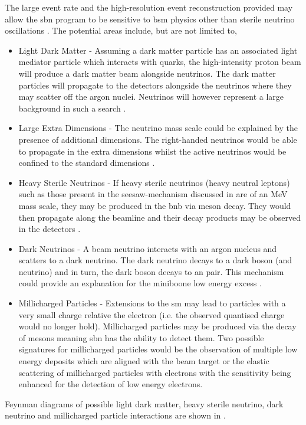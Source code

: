 The large event rate and the high-resolution event reconstruction provided may allow the \gls{sbn} program to be sensitive to \gls{bsm} physics other than sterile neutrino oscillations \cite{SBN_paper}. The potential areas include, but are not limited to,
\begin{itemize}
    \item Light Dark Matter - Assuming a dark matter particle has an associated light mediator particle which interacts with quarks, the high-intensity proton beam will produce a dark matter beam alongside neutrinos. The dark matter particles will propagate to the detectors alongside the neutrinos where they may scatter off the argon nuclei. Neutrinos will however represent a large background in such a search \cite{SBN_paper}. 
    \item Large Extra Dimensions - The neutrino mass scale could be explained by the presence of additional dimensions. The right-handed neutrinos would be able to propagate in the extra dimensions whilst the active neutrinos would be confined to the standard dimensions \cite{SBN_paper}. 
    \item Heavy Sterile Neutrinos - If heavy sterile neutrinos (heavy neutral leptons) such as those present in the seesaw-mechanism discussed in  are of an MeV mass scale, they may be produced in the \gls{bnb} via meson decay. They would then propagate along the beamline and their decay products may be observed in the detectors \cite{SBN_paper}\cite{MeV_scale_sterile_neutrino}.
    \item Dark Neutrinos - A beam neutrino interacts with an argon nucleus and scatters to a dark neutrino. The dark neutrino decays to a dark boson (and neutrino) and in turn, the dark boson decays to an \positron \electron pair. This mechanism could provide an explanation for the \gls{miniboone} low energy excess \cite{SBN_paper}\cite{dark_neutrino}. 
    \item Millicharged Particles - Extensions to the \gls{sm} may lead to particles with a very small charge relative the electron (i.e. the observed quantised charge would no longer hold). Millicharged particles may be produced via the decay of mesons meaning \gls{sbn} has the ability to detect them. Two possible signatures for millicharged particles would be the observation of multiple low energy deposits which are aligned with the beam target or the elastic scattering of millicharged particles with electrons with the sensitivity being enhanced for the detection of low energy electrons.
\end{itemize}
Feynman diagrams of possible light dark matter, heavy sterile neutrino, dark neutrino and millicharged particle interactions are shown in .

